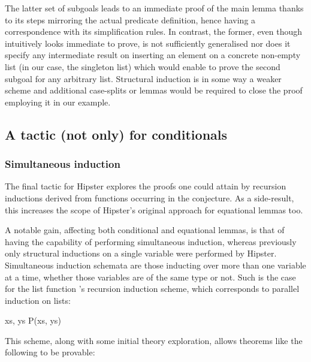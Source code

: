 The latter set of subgoals leads to an immediate proof of the main lemma thanks to its steps mirroring the actual predicate definition, hence having a correspondence with its simplification rules.
%
In contrast, the former, even though intuitively looks immediate to prove, is not sufficiently generalised nor does it specify any intermediate result on inserting an element on a concrete non-empty list (in our case, the singleton list) which would enable to prove the second subgoal for any arbitrary list. Structural induction is in some way a weaker scheme and additional case-splits or lemmas would be required to close the proof employing it in our example.


\subsection{A tactic (not only) for conditionals}

\subsubsection*{Simultaneous induction}

The final tactic for Hipster explores the proofs one could attain by recursion inductions derived from functions occurring in the conjecture.
%
As a side-result, this increases the scope of Hipster's original approach for equational lemmas too.

A notable gain, affecting both conditional and equational lemmas, is that of having the capability of performing simultaneous induction, whereas previously only structural inductions on a single variable were performed by Hipster.
%
Simultaneous induction schemata are those inducting over more than one variable at a time, whether those variables are of the same type or not.
%
Such is the case for the list function 's recursion induction scheme, which corresponds to parallel induction on lists:

\vspace{2 mm}

  {\forall xs, \; ys \;\; P\;(xs,\; ys)}

\vspace{2 mm}

\noindent This scheme, along with some initial theory exploration, allows theorems like the following to be provable:


